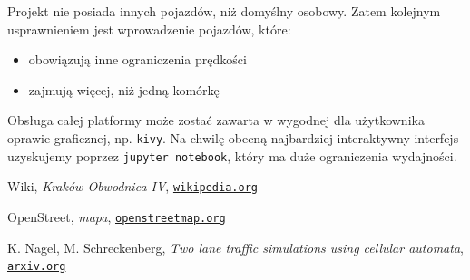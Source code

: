 \documentclass[a4paper,12pt]{article}
\begin{document}
    Projekt nie posiada innych pojazdów, niż domyślny osobowy. Zatem kolejnym usprawnieniem jest wprowadzenie pojazdów, które: 
    \begin{itemize}
    	\item obowiązują inne ograniczenia prędkości
    	\item zajmują więcej, niż jedną komórkę
    \end{itemize}

	Obsługa całej platformy może zostać zawarta w wygodnej dla użytkownika oprawie graficznej, np. \texttt{kivy}. Na chwilę obecną najbardziej interaktywny interfejs uzyskujemy poprzez \texttt{jupyter notebook}, który ma duże ograniczenia wydajności.

	\pagebreak
	\begin{thebibliography}{15}
		Wiki, \textit{Kraków Obwodnica IV},
		\texttt{\href{https://pl.wikipedia.org/wiki/Obwodnice_Krakowa\#IV_obwodnica}{wikipedia.org}}
		
		OpenStreet, \textit{mapa},
		\texttt{\href{https://www.openstreetmap.org/}{openstreetmap.org}}
		
		K. Nagel, M. Schreckenberg, \textit{Two lane traffic simulations using cellular automata},
		\texttt{\href{https://arxiv.org/pdf/cond-mat/9512119.pdf}{arxiv.org}}
	\end{thebibliography}
	
\end{document}
